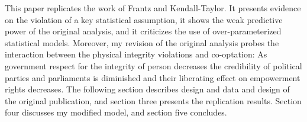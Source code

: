 This paper replicates the work of Frantz and Kendall-Taylor.
It presents evidence on the violation of a key statistical 
assumption, it shows the weak predictive power of the 
original analysis, and it criticizes the use of 
over-parameterized statistical models. Moreover, my revision
of the original analysis probes the interaction between the 
physical integrity violations and co-optation: As government 
respect for the integrity of person decreases the 
credibility of political parties and parliaments is 
diminished and their liberating effect on empowerment rights 
decreases. The following section describes design and data 
and design of the original publication, and section three 
presents the replication results. Section four discusses my 
modified model, and section five concludes.